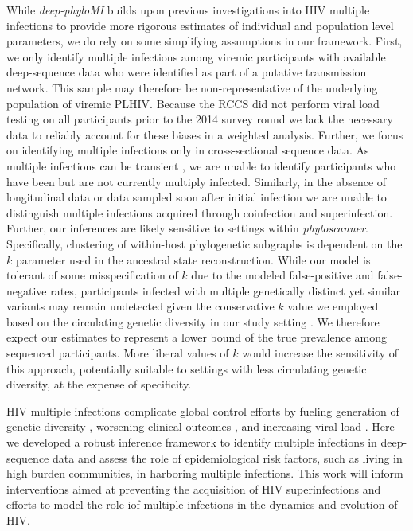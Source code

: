 \documentclass[10pt,letterpaper]{article}
\begin{document}
While \textit{deep-phyloMI} builds upon previous investigations into HIV multiple infections to provide more rigorous estimates of individual and population level parameters, we do rely on some simplifying assumptions in our framework. First, we only identify multiple infections among viremic participants with available deep-sequence data who were identified as part of a putative transmission network. This sample may therefore be non-representative of the underlying population of viremic PLHIV. Because the RCCS did not perform viral load testing on all participants prior to the 2014 survey round we lack the necessary data to reliably account for these biases in a weighted analysis. Further, we focus on identifying multiple infections only in cross-sectional sequence data. As multiple infections can be transient \cite{ronen2013}, we are unable to identify participants who have been but are not currently multiply infected. Similarly, in the absence of longitudinal data or data sampled soon after initial infection we are unable to distinguish multiple infections acquired through coinfection and superinfection. Further, our inferences are likely sensitive to settings within \textit{phyloscanner}. Specifically, clustering of within-host phylogenetic subgraphs is dependent on the $k$ parameter used in the ancestral state reconstruction. While our model is tolerant of some misspecification of $k$ due to the modeled false-positive and false-negative rates, participants infected with multiple genetically distinct yet similar variants may remain undetected given the conservative $k$ value we employed based on the circulating genetic diversity in our study setting \cite{kim2024}. We therefore expect our estimates to represent a lower bound of the true prevalence among sequenced participants. More liberal values of $k$ would increase the sensitivity of this approach, potentially suitable to settings with less circulating genetic diversity, at the expense of specificity. \par

HIV multiple infections complicate global control efforts by fueling generation of genetic diversity \cite{ramirez2008}, worsening clinical outcomes \cite{gottlieb2004, smith2004}, and increasing viral load \cite{smith2004, ronen2013, janes2015}. Here we developed a robust inference framework to identify multiple infections in deep-sequence data and assess the role of epidemiological risk factors, such as living in high burden communities, in harboring multiple infections. This work will inform interventions aimed at preventing the acquisition of HIV superinfections and efforts to model the role iof multiple infections in the dynamics and evolution of HIV. 
\end{document}
